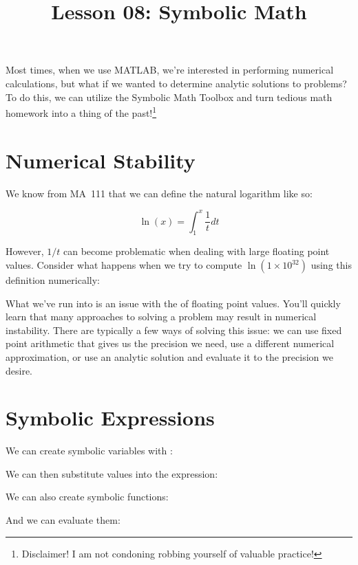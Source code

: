\documentclass{article}
\title{Lesson 08: Symbolic Math}
\begin{document}
\renderTitle

Most times, when we use MATLAB, we're interested in performing numerical
calculations, but what if we wanted to determine analytic solutions to
problems?  To do this, we can utilize the Symbolic Math Toolbox%
 and turn
tedious math homework into a thing of the past!\footnote{Disclaimer!
I am not condoning robbing yourself of valuable practice!}

\section{Numerical Stability}

We know from MA~111 that we can define the natural logarithm like so:

\begin{equation}
	\ln(x)
	=
	\int^x_1
	\frac{1}{t}
	dt
\end{equation}

However, \(1 / t\) can become problematic when dealing with large
floating point values.  Consider what happens when we try to compute
\(\ln\left(1 \times 10^{32}\right)\) using this definition numerically:


What we've run into is an issue with the  of
floating point values.  You'll quickly learn that many approaches to
solving a problem may result in numerical instability.  There are
typically a few ways of solving this issue: we can use fixed point
arithmetic that gives us the precision we need, use a different
numerical approximation, or use an analytic solution and evaluate it to
the precision we desire.

\section{Symbolic Expressions}

We can create symbolic variables with
:


We can then substitute values into the expression:


We can also create symbolic functions:


And we can evaluate them:

\end{document}
